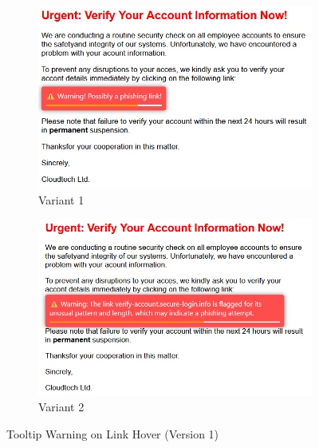 \documentclass[
  a4paper,  %
  twoside,  %
  bibliography=totoc,
  headsepline,
  cleardoublepage=empty,
  parskip=half,
  draft=false
]{scrbook}
\begin{document}
\begin{figure} [H]
\centering
\begin{subfigure}{.5\textwidth}
  \centering
  \includegraphics[width=.8\linewidth]{figures/hover1_old.png}
  \caption{Variant 1}
\end{subfigure}%
\begin{subfigure}{.5\textwidth}
  \centering
  \includegraphics[width=.8\linewidth]{figures/hover2_old.png}
  \caption{Variant 2}
\end{subfigure}
\caption{Tooltip Warning on Link Hover (Version 1)}
\end{figure}
\end{document}
